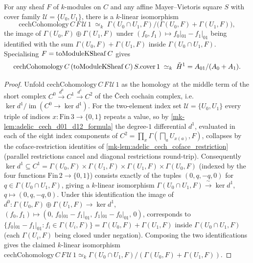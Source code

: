 \begin{proposition}
  \label{mk-thm:adelic_cechH1_eq_cokernel}
  \leanok
  For any sheaf \(F\) of \(k\)-modules on \(C\) and any affine
  Mayer--Vietoris square \(S\) with cover family \(\mathcal U = \{U_0,
  U_1\}\), there is a \(k\)-linear isomorphism
  \[
    \mathrm{cechCohomology}\, C\, F\, \mathcal U\, 1
    \;\simeq_k\; \Gamma(U_0 \cap U_1, F) \big/
      \bigl(\Gamma(U_0, F) + \Gamma(U_1, F)\bigr),
  \]
  the image of \(\Gamma(U_0, F) \oplus \Gamma(U_1, F)\) under
  \((f_0, f_1) \mapsto f_0|_{01} - f_1|_{01}\) being identified with the
  sum \(\Gamma(U_0, F) + \Gamma(U_1, F)\) inside \(\Gamma(U_0 \cap U_1,
  F)\). Specialising \(F = \operatorname{toModuleKSheaf} C\) gives
  \[
    \mathrm{cechCohomology}\, C\, (\operatorname{toModuleKSheaf} C)\, S.\mathrm{cover}\, 1
      \;\simeq_k\; \check{H}^1 = A_{01}/(A_0 + A_1).
  \]
\end{proposition}
\begin{proof}
  \leanok
  Unfold \(\mathrm{cechCohomology}\, C\, F\, \mathcal U\, 1\) as the
  homology at the middle term of the short complex
  \(C^0 \xrightarrow{d^0} C^1 \xrightarrow{d^1} C^2\) of the Čech
  cochain complex, i.e.\ \(\ker d^1 / \operatorname{im}(C^0 \to \ker
  d^1)\). For the two-element index set \(\mathcal U = \{U_0, U_1\}\)
  every triple of indices \(x \colon \mathrm{Fin}\,3 \to \{0,1\}\)
  repeats a value, so by \ref{mk-lem:adelic_cech_d01_d12_formula} the
  degree-\(1\) differential \(d^1\), evaluated in each of the eight
  index components of \(C^2 = \prod_x \Gamma(\bigsqcap_a
  U_{x(a)}, F)\), collapses by the coface-restriction identities of
  \ref{mk-lem:adelic_cech_coface_restriction} (parallel restrictions
  cancel and diagonal restrictions round-trip). Consequently
  \(\ker d^1 \subseteq C^1 = \Gamma(U_0, F) \times \Gamma(U_1, F) \times
  \Gamma(U_1, F) \times \Gamma(U_0, F)\) (indexed by the four functions
  \(\mathrm{Fin}\,2 \to \{0,1\}\)) consists exactly of the tuples
  \((0, q, -q, 0)\) for \(q \in \Gamma(U_0 \cap U_1, F)\), giving a
  \(k\)-linear isomorphism \(\Gamma(U_0 \cap U_1, F) \xrightarrow{\ \sim\
  } \ker d^1\), \(q \mapsto (0, q, -q, 0)\). Under this identification
  the image of \(d^0 \colon \Gamma(U_0, F) \oplus \Gamma(U_1, F) \to
  \ker d^1\), \((f_0, f_1) \mapsto (0,\, f_0|_{01} - f_1|_{01},\,
  f_1|_{01} - f_0|_{01},\, 0)\), corresponds to \(\{ f_0|_{01} -
  f_1|_{01} : f_i \in \Gamma(U_i, F)\} = \Gamma(U_0, F) + \Gamma(U_1,
  F)\) inside \(\Gamma(U_0 \cap U_1, F)\) (each \(\Gamma(U_i, F)\) being
  closed under negation). Composing the two identifications gives the
  claimed \(k\)-linear isomorphism
  \(\mathrm{cechCohomology}\, C\, F\, \mathcal U\, 1 \simeq_k
  \Gamma(U_0 \cap U_1, F)/(\Gamma(U_0, F) + \Gamma(U_1, F))\).
\end{proof}

